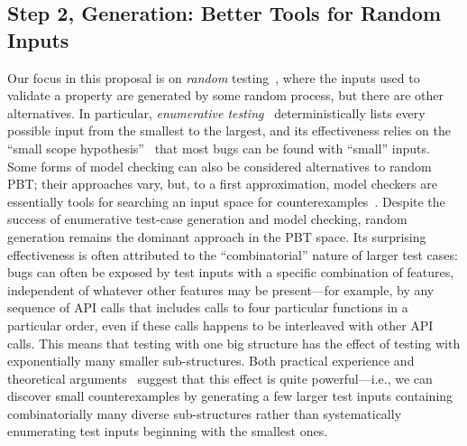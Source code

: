 \subsection{Step 2, Generation: Better Tools for Random Inputs }\label{sec:gen}

Our focus in this proposal is on {\em random}
testing~\cite{hamlet1994random}, where the inputs used to validate a
property are generated by some random process, but there are other
alternatives. In particular, {\em enumerative
  testing}~\cite[etc.]{DBLP:conf/haskell/RuncimanNL08, leancheck}
deterministically lists every possible input from the smallest to the
largest, and its effectiveness relies on the ``small scope
hypothesis''~\cite{jackson1996elements} that most bugs can be found
with ``small'' inputs. Some\iflater{}\fi{} forms of model
checking can also be considered alternatives to random PBT; their
approaches vary, but, to a first approximation, model checkers are
essentially tools for searching an input space for
counterexamples~\cite{biere2009bounded}.
%
Despite the success of enumerative test-case generation and model
checking, random generation remains the dominant approach in the PBT
space. Its surprising effectiveness is often attributed to the
``combinatorial'' nature of larger test cases: bugs can often be
exposed by test inputs with a specific combination of features,
independent of whatever other features may be present---for example,
by any sequence of API calls that includes calls to four particular
functions in a particular order, even if these calls happens to be
interleaved with other API calls.  This means that testing with one
big structure has the effect of testing with exponentially many
smaller sub-structures. Both practical experience and theoretical
arguments~\cite{HarryPaper} suggest that this effect is quite
powerful---i.e., we can discover small counterexamples by generating
a few larger test inputs containing combinatorially many diverse
sub-structures rather than systematically enumerating test inputs
beginning with the smallest ones. 

